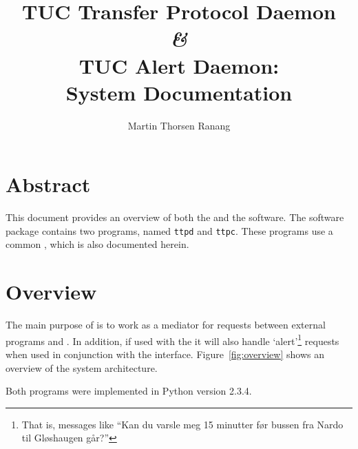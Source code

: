 \documentclass[a4paper,english,11pt,twoside,openright]{book}
\title{TUC Transfer Protocol Daemon \\ \textit{\&} \\ TUC Alert
  Daemon: \\[2em] System Documentation}
\author{Martin Thorsen Ranang}
\newcommand{\code}[1]{\texttt{#1}}
\begin{document}
\frontmatter
\maketitle

\tableofcontents

%
%



%


\chapter{Abstract}
\label{cha:abstract}

This document provides an overview of both the  and the
 software.  The software package contains two programs,
named \code{ttpd} and \code{ttpc}.  These programs use a common
, which is also documented herein.

\mainmatter

\chapter{Overview}
\label{cha:overview}

The main purpose of  is to work as a mediator for requests
between external programs and .  In addition, if used with
the  it will also handle `alert'\footnote{That is, messages
  like ``Kan du varsle meg 15 minutter før bussen fra Nardo til
  Gløshaugen går?''} requests when used in conjunction with the
 interface.  Figure~\ref{fig:overview} shows an overview of
the system architecture.

Both programs were implemented in Python version 2.3.4.
\end{document}
